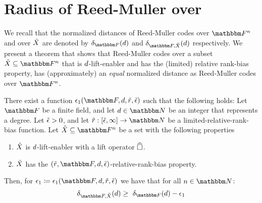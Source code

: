 \section[Radius of Reed-Muller over \titlevariety]{Radius of Reed-Muller over \titlevariety}\label{sec:radius-of-RM-over-X}
We recall that the normalized distances of Reed-Muller codes over $\field$ and over ${\tilde{X}}$
are denoted by $\normalizedcodedistance{\basefield}{\degree}$ and $\normalizedcodedistanceex{\basefield}{\variety}{\degree}$ respectively.
We present a theorem that shows that Reed-Muller codes over a subset $\variety \subseteq \field$ that is $d$-lift-enabler and has the (limited) relative rank-bias property,
has (approximately) an \emph{equal} normalized distance as Reed-Muller codes over $\field$.
\begin{theorem}\label{thm:distance-of-RM-in-X}
    There exist a function $\epsilon_1(\basefield, \degree, \rankbiasfunc, \epsilonlimitedrankbias)$  such that the following holds:
    Let $\basefield$ be a finite field, and let $\degree \in \naturalnumbersset$ be an integer that represents a degree.
    Let ${\tilde{\epsilon}} > 0$, and let $\funcdef{\rankbiasfunc}{[\epsilonlimitedrankbias, \infty]}{\naturalnumbersset}$ be a limited-relative-rank-bias function.
    \newline
    Let $\variety \subseteq \field$ be a set with the following properties
    \begin{enumerate}
        \item ${\tilde{X}}$ is $d$-lift-enabler with a lift operator $\widehat{\square}$.
        \item ${\tilde{X}}$ has the $(\rankbiasfunc, \basefield, \degree, \epsilonlimitedrankbias)$-relative-rank-bias property.
    \end{enumerate}
    Then, for $\epsilon_1 \definedas \epsilon_1(\basefield, \degree, \rankbiasfunc, \epsilonlimitedrankbias)$ we have that for all $\blocklength \in \naturalnumbersset$:
    \[
        \normalizedcodedistanceex{\basefield}{\variety}{\degree} \geq \
        \normalizedcodedistance{\basefield}{\degree} - \epsilon_1
    \]
\end{theorem}
